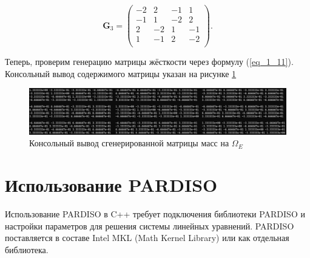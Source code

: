 \begin{equation*}
	\textbf{G}_3 = \left(
	\begin{array}{rrrr}
		-2 & 2 & -1 & 1 \\
		-1 & 1 & -2 & 2 \\
		2 & -2 & 1 & -1 \\
		1 & -1 & 2 & -2 \\
	\end{array}
	\right).
\end{equation*}

Теперь, проверим генерацию матрицы жёсткости через формулу (\ref{eq_1_11}). Консольный вывод содержимого матрицы указан на рисунке \ref{fig:GeneratedMatrixStiffness}

\begin{figure}
	\centering
	\vspace*{0.7cm}
	\includegraphics[width=1.0\linewidth]{images/G.png}
	\caption{Консольный вывод сгенерированной матрицы масс на $\Omega_E$}
	\label{fig:GeneratedMatrixStiffness}
\end{figure}

\section{Использование PARDISO}

Использование PARDISO в C++ требует подключения библиотеки PARDISO и настройки параметров для решения системы линейных уравнений. PARDISO поставляется в составе Intel MKL (Math Kernel Library) или как отдельная библиотека.

